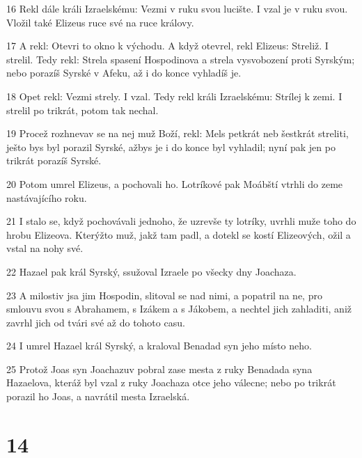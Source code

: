 \par 16 Rekl dále králi Izraelskému: Vezmi v ruku svou lucište. I vzal je v ruku svou. Vložil také Elizeus ruce své na ruce královy.
\par 17 A rekl: Otevri to okno k východu. A když otevrel, rekl Elizeus: Streliž. I strelil. Tedy rekl: Strela spasení Hospodinova a strela vysvobození proti Syrským; nebo porazíš Syrské v Afeku, až i do konce vyhladíš je.
\par 18 Opet rekl: Vezmi strely. I vzal. Tedy rekl králi Izraelskému: Strílej k zemi. I strelil po trikrát, potom tak nechal.
\par 19 Procež rozhnevav se na nej muž Boží, rekl: Mels petkrát neb šestkrát streliti, ješto bys byl porazil Syrské, ažbys je i do konce byl vyhladil; nyní pak jen po trikrát porazíš Syrské.
\par 20 Potom umrel Elizeus, a pochovali ho. Lotríkové pak Moábští vtrhli do zeme nastávajícího roku.
\par 21 I stalo se, když pochovávali jednoho, že uzrevše ty lotríky, uvrhli muže toho do hrobu Elizeova. Kterýžto muž, jakž tam padl, a dotekl se kostí Elizeových, ožil a vstal na nohy své.
\par 22 Hazael pak král Syrský, ssužoval Izraele po všecky dny Joachaza.
\par 23 A milostiv jsa jim Hospodin, slitoval se nad nimi, a popatril na ne, pro smlouvu svou s Abrahamem, s Izákem a s Jákobem, a nechtel jich zahladiti, aniž zavrhl jich od tvári své až do tohoto casu.
\par 24 I umrel Hazael král Syrský, a kraloval Benadad syn jeho místo neho.
\par 25 Protož Joas syn Joachazuv pobral zase mesta z ruky Benadada syna Hazaelova, kteráž byl vzal z ruky Joachaza otce jeho válecne; nebo po trikrát porazil ho Joas, a navrátil mesta Izraelská.

\chapter{14}

